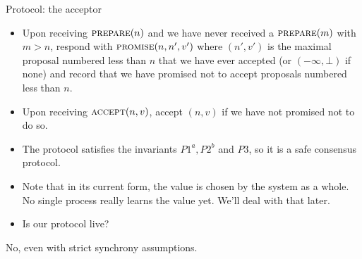 \documentclass{beamer}
\begin{document}
\begin{frame}{Protocol: the acceptor}
  \begin{itemize}
    \item Upon receiving $\textsc{prepare}(n)$ and we have never received a $\textsc{prepare}(m)$ with $m > n$, respond with $\textsc{promise}(n, n', v')$ where $(n', v')$ is the maximal proposal numbered less than $n$ that we have ever accepted (or $(-\infty, \bot)$ if none) and record that we have promised not to accept proposals numbered less than $n$.
    \item Upon receiving $\textsc{accept}(n, v)$, accept $(n, v)$ if we have not promised not to do so.
  \end{itemize}
\end{frame}

\begin{frame}
  \begin{itemize}
  \item The protocol satisfies the invariants $P1^a, P2^b$ and $P3$, so it is a safe consensus protocol.
  \item Note that in its current form, the value is chosen by the system as a whole. No single process really learns the value yet. We'll deal with that later.
  \item Is our protocol \alert{live}?
  \end{itemize}
\end{frame}

\begin{frame}{No, even with strict synchrony assumptions.}
  \begin{figure}[!h]
  \centering
  \end{figure}
\end{frame}
\end{document}
